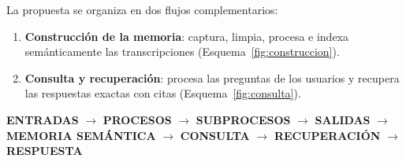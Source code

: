 \documentclass[12pt,a4paper]{article}
\begin{document}
La propuesta se organiza en dos flujos complementarios:

\begin{enumerate}
  \item \textbf{Construcción de la memoria}: captura, limpia, procesa e indexa semánticamente las transcripciones (Esquema~\ref{fig:construccion}).
  \item \textbf{Consulta y recuperación}: procesa las preguntas de los usuarios y recupera las respuestas exactas con citas (Esquema~\ref{fig:consulta}).
\end{enumerate}

\begin{cajaresaltado}
  \centering
  \small\textbf{ENTRADAS} $\rightarrow$ \textbf{PROCESOS} $\rightarrow$ \textbf{SUBPROCESOS} $\rightarrow$ \textbf{SALIDAS} $\rightarrow$ \textbf{MEMORIA SEMÁNTICA} $\rightarrow$ \textbf{CONSULTA} $\rightarrow$ \textbf{RECUPERACIÓN} $\rightarrow$ \textbf{RESPUESTA}
\end{cajaresaltado}

\clearpage
\end{document}
